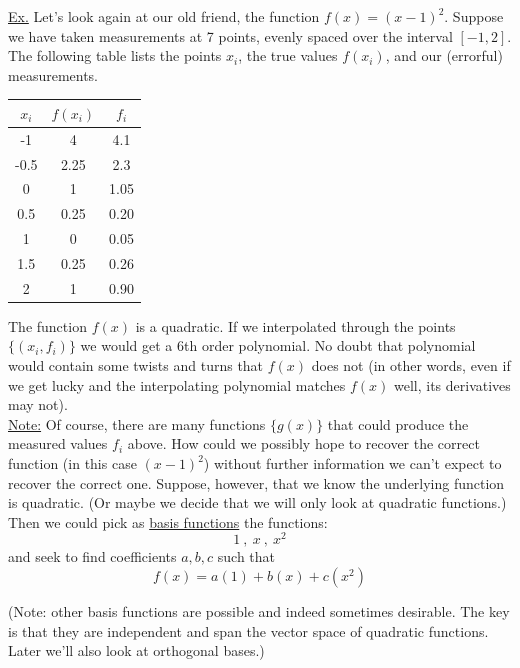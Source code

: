 {\underline{Ex.} Let's look again at our old friend, the function $f(x) = (x-1)^2$. Suppose we have taken measurements at 7 points, evenly spaced over the interval $[-1,2]$. The following table lists the points $x_i$, the true values $f(x_i)$, and our (errorful) measurements.

\begin{table}[H]
\centering
\begin{tabular}{ccc}
\hline
$x_i$ & $f(x_i)$ & $f_i$ \\ \hline
-1   & 4       & 4.1  \\
-0.5 & 2.25    & 2.3  \\
0    & 1       & 1.05 \\
0.5  & 0.25    & 0.20 \\
1    & 0       & 0.05 \\
1.5  & 0.25    & 0.26 \\
2    & 1       & 0.90 \\ \hline
\end{tabular}
\end{table}

The function $f(x)$ is a quadratic. If we interpolated through the points $\{(x_i, f_i)\}$ we would get a 6th order polynomial. No doubt that polynomial would contain some twists and turns that $f(x)$ does not (in other words, even if we get lucky and the interpolating polynomial matches $f(x)$ well, its derivatives may not). \\

\underline{Note:} Of course, there are many functions $\{g(x)\}$ that could produce the measured values $f_i$ above. How could we possibly hope to recover the correct function (in this case $(x-1)^2$) without further information we can't expect to recover the correct one. Suppose, however, that we know the underlying function is quadratic. (Or maybe we decide that we will only look at quadratic functions.)\\

Then we could pick as \underline{basis functions} the functions:
\begin{equation*}
    1~,~x~,~x^2
\end{equation*}
and seek to find coefficients $a,b,c$ such that
\begin{equation*}
    f(x) = a(1) + b(x) + c(x^2)
\end{equation*}

(Note: other basis functions are possible and indeed sometimes desirable. The key is that they are independent and span the vector space of quadratic functions. Later we'll also look at orthogonal bases.) \\

}
